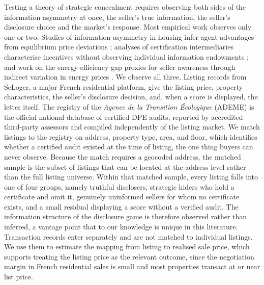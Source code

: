 Testing a theory of strategic concealment requires observing both sides of the information
asymmetry at once, the seller's true information, the seller's disclosure choice and the
market's response. Most empirical work observes only one or two. Studies of information
asymmetry in housing infer agent advantages from equilibrium price deviations
\citep{levitt_syverson_2008}; analyses of certification intermediaries characterise incentives
without observing individual information endowments \citep{lizzeri_1999}; and work on the
energy-efficiency gap proxies for seller awareness through indirect variation in energy prices
\citep{myers_asymmetric_2020}. We observe all three. Listing records from SeLoger, a major
French residential platform, give the listing price, property characteristics, the seller's
disclosure decision, and, when a score is displayed, the letter itself. The registry of the
\emph{Agence de la Transition \'Ecologique} (ADEME) is the official national database of
certified DPE audits, reported by accredited third-party assessors and compiled independently
of the listing market. We match listings to the registry on address, property type, area, and
floor, which identifies whether a certified audit existed at the time of listing, the one
thing buyers can never observe. Because the match requires a geocoded address, the matched
sample is the subset of listings that can be located at the address level rather than the full
listing universe. Within that matched sample, every listing falls into one of four groups, namely
truthful disclosers, strategic hiders who hold a certificate and omit it, genuinely uninformed
sellers for whom no certificate exists, and a small residual displaying a score without a
verified audit. The information structure of the disclosure game is therefore observed rather
than inferred, a vantage point that to our knowledge is unique in this literature. Transaction
records enter separately and are not matched to individual listings. We use them to estimate
the mapping from listing to realised sale price, which supports treating the listing price as
the relevant outcome, since the negotiation margin in French residential sales is small and
most properties transact at or near list price.

